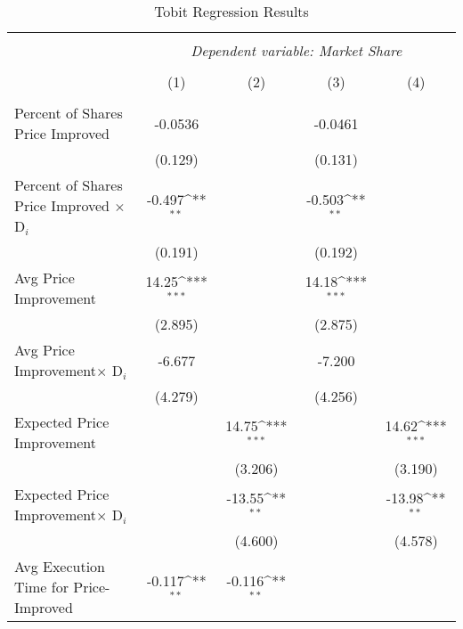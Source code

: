 \documentclass[12pt,a4paper]{article}
\def\sym#1{\ifmmode^{#1}\else\(^{#1}\)\fi}
\begin{document}
\begin{table}[t] 
	\caption{Tobit Regression Results} 
	\label{} 
	\footnotesize
	\begin{tabular}{@{\extracolsep{0.6em}}lcccc} 
		\\[-4ex]\hline  
		\hline \\[-1.8ex]  
		& \multicolumn{4}{c}{\textit{Dependent variable: Market Share}} \\  
		\cline{2-5}  
		\\[-1.8ex] & (1) & (2) & (3) & (4)\\  
		\hline \\[-1.8ex]  
		Percent of Shares Price Improved   &     -0.0536         &                     &     -0.0461         &                     \\
		&     (0.129)         &                     &     (0.131)         &                     \\
		[0.5em]
		Percent of Shares Price Improved  $\times$ D$_i$  &  -0.497\sym{**} &                     &      -0.503\sym{**} &                     \\
		&     (0.191)         &                     &     (0.192)         &                     \\
		[0.5em]
		Avg Price Improvement&       14.25\sym{***}&                     &       14.18\sym{***}&                     \\
		&     (2.895)         &                     &     (2.875)         &                     \\
		[0.5em]
		Avg Price Improvement$\times$ D$_i$&      -6.677         &                     &      -7.200         &                     \\
		&     (4.279)         &                     &     (4.256)         &                     \\
		[0.5em]
		Expected Price Improvement&                     &       14.75\sym{***}&                     &       14.62\sym{***}\\
		&                     &     (3.206)         &                     &     (3.190)         \\
		[0.5em]
		Expected Price Improvement$\times$ D$_i$&                     &      -13.55\sym{**} &                     &      -13.98\sym{**} \\
		&                     &     (4.600)         &                     &     (4.578)         \\
		[0.5em]
		Avg Execution Time for Price-Improved  &      -0.117\sym{**} &      -0.116\sym{**} &                     &                     \\

\end{tabular}
\end{table}
\end{document}
